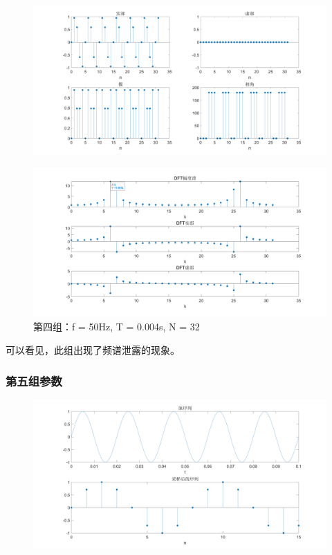 \documentclass{../source/Experiment copy}
\begin{document}
                \begin{figure}[H]
                    \centering
                    \includegraphics[width = \textwidth]{src/exp2_4_2.png}
                \end{figure}

                \begin{figure}[H]
                    \centering
                    \includegraphics[width = \textwidth]{src/exp2_4_3.png}
                    \caption{第四组：f = 50Hz, T = 0.004s, N = 32}
                \end{figure}
            可以看见，此组出现了频谱泄露的现象。
            \subsubsection{第五组参数}
                \begin{figure}[H]
                    \centering
                    \includegraphics[width = \textwidth]{src/exp2_5_1.png}
                \end{figure}
\end{document}
